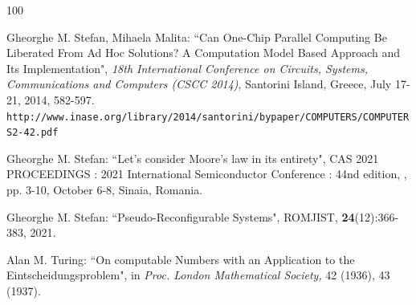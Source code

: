 \begin{thebibliography}{100}


 Gheorghe M. Stefan, Mihaela Malita: ``Can One-Chip Parallel Computing Be Liberated From Ad Hoc Solutions? A Computation Model Based Approach and Its Implementation", {\em 18th International Conference on Circuits, Systems, Communications and Computers (CSCC 2014)}, Santorini Island, Greece, July 17-21, 2014, 582-597. \\ {\tt  http://www.inase.org/library/2014/santorini/bypaper/COMPUTERS/COMPUTERS2-42.pdf}

 Gheorghe M. Stefan:  ``Let's consider Moore's law in its entirety", CAS 2021 PROCEEDINGS : 2021 International Semiconductor Conference : 44nd edition, , pp. 3-10, October 6-8, Sinaia, Romania.

 Gheorghe M. Stefan:  ``Pseudo-Reconfigurable Systems", ROMJIST, {\bf 24}(12):366-383, 2021.






 Alan M. Turing: ``On computable Numbers with an
 Application to the Eintscheidungsproblem", in {\em Proc. London Mathematical
 Society,} 42 (1936), 43 (1937).


\end{thebibliography}
